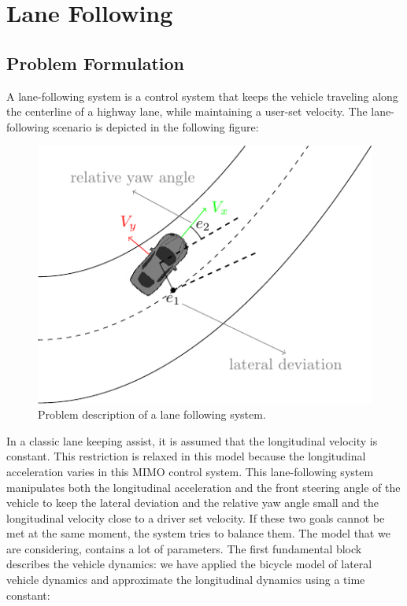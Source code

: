 \documentclass[conference, 11pt]{IEEEtran}
\begin{document}
\section{Lane Following}
\subsection{Problem Formulation}
A lane-following system is a control system that keeps the vehicle traveling along the centerline of a highway lane, while maintaining a user-set velocity. The lane-following scenario is depicted in the following figure:
\begin{figure}[!h]
	\centering
	\includegraphics[width=0.75\columnwidth]{./figure/laneFollowing/laneFollowing.pdf}
	\caption{Problem description of a lane following system.}
	\label{fig:laneFollowing}
\end{figure}

In a classic lane keeping assist, it is assumed that the longitudinal velocity is constant. This restriction is relaxed in this model because the longitudinal acceleration varies in this MIMO control system. This lane-following system manipulates both the longitudinal acceleration and the front steering angle of the vehicle to keep the lateral deviation and the relative yaw angle small and the longitudinal velocity close to a driver set velocity. If these two goals cannot be met at the same moment, the system tries to balance them. The model that we are considering, contains a lot of parameters. The first fundamental block describes the vehicle dynamics: we have applied the bicycle model of lateral vehicle dynamics and approximate the longitudinal dynamics using a time constant:
\end{document}
